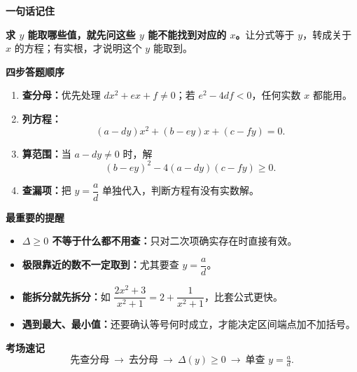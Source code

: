 \clearpage
\begin{summarybox}
  \textbf{\textcolor{CSummary}{一句话记住}}

  \medskip
  \textbf{求 $y$ 能取哪些值，就先问这些 $y$ 能不能找到对应的 $x$。}让分式等于 $y$，转成关于 $x$ 的方程；有实根，才说明这个 $y$ 能取到。

  \medskip
  \textbf{\textcolor{CSummary}{四步答题顺序}}
  \begin{enumerate}[leftmargin=*,itemsep=0.35em]
    \item \textbf{查分母：}优先处理 $dx^2+ex+f\ne0$；若 $e^2-4df<0$，任何实数 $x$ 都能用。
    \item \textbf{列方程：}
    \[
      (a-dy)x^2+(b-ey)x+(c-fy)=0.
    \]
    \item \textbf{算范围：}当 $a-dy\ne0$ 时，解
    \[
      \boxed{(b-ey)^2-4(a-dy)(c-fy)\ge0.}
    \]
    \item \textbf{查漏项：}把 $y=\dfrac ad$ 单独代入，判断方程有没有实数解。
  \end{enumerate}

  \medskip
  \textbf{\textcolor{CSummary}{最重要的提醒}}
  \begin{itemize}[leftmargin=*,itemsep=0.3em]
    \item \textbf{$\Delta\ge0$ 不等于什么都不用查：}只对二次项确实存在时直接有效。
    \item \textbf{极限靠近的数不一定取到：}尤其要查 $y=\dfrac ad$。
    \item \textbf{能拆分就先拆分：}如 $\dfrac{2x^2+3}{x^2+1}=2+\dfrac1{x^2+1}$，比套公式更快。
    \item \textbf{遇到最大、最小值：}还要确认等号何时成立，才能决定区间端点加不加括号。
  \end{itemize}

  \medskip
  \textbf{\textcolor{CSummary}{考场速记}}
  \[
    \boxed{\text{先查分母}\ \longrightarrow\ \text{去分母}\ \longrightarrow\ \Delta(y)\ge0\ \longrightarrow\ \text{单查 }y=\tfrac ad.}
  \]


  \bigskip
  \end{summarybox}
\clearpage
